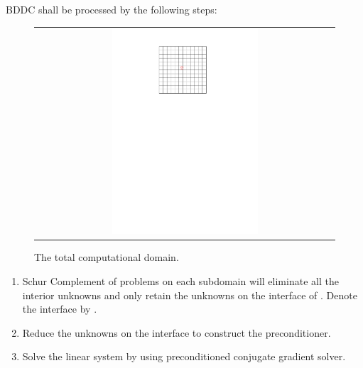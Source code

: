 BDDC shall be processed by the following steps:

\begin{figure}[h]
	\centering
	\begin{tabular}{c}
		\includegraphics[width=0.5\textwidth]{./pics/domain.pdf}
	\end{tabular}
	\caption{\footnotesize The total computational domain.}\label{fig3: domain}
\end{figure}

\begin{enumerate}
	\item	Schur Complement \cite{duff1986direct} of problems on each subdomain  will eliminate all the interior unknowns and only retain the unknowns on the interface of . Denote the interface by .
	\item	Reduce the unknowns on the interface to construct the preconditioner.
	\item	Solve the linear system by using preconditioned conjugate gradient solver.
\end{enumerate}


